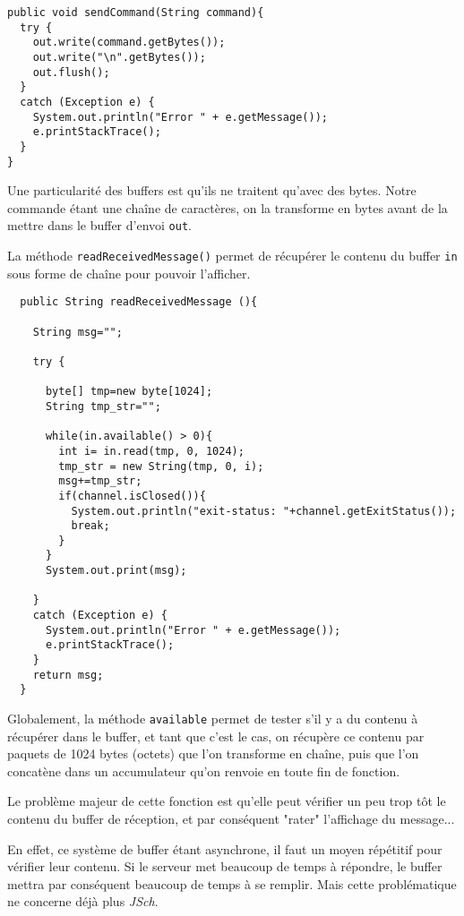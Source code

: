 \begin{verbatim}
public void sendCommand(String command){
  try {
    out.write(command.getBytes());
    out.write("\n".getBytes());
    out.flush();
  }
  catch (Exception e) {
    System.out.println("Error " + e.getMessage());
    e.printStackTrace();
  }
}
\end{verbatim}

\par Une particularité des buffers est qu'ils ne traitent qu'avec des bytes. Notre commande étant une chaîne de caractères, on la transforme en bytes avant de la mettre dans le buffer d'envoi \texttt{out}.
\par La méthode \texttt{readReceivedMessage()} permet de récupérer le contenu du buffer \texttt{in} sous forme de chaîne pour pouvoir l'afficher.

\begin{verbatim}
  public String readReceivedMessage (){
    
    String msg="";
    
    try {
      
      byte[] tmp=new byte[1024];
      String tmp_str="";
      
      while(in.available() > 0){
        int i= in.read(tmp, 0, 1024);
        tmp_str = new String(tmp, 0, i);
        msg+=tmp_str;
        if(channel.isClosed()){
          System.out.println("exit-status: "+channel.getExitStatus());
          break;
        }
      }
      System.out.print(msg);
      
    }
    catch (Exception e) {
      System.out.println("Error " + e.getMessage());
      e.printStackTrace();
    }
    return msg;
  }
\end{verbatim}

\par Globalement, la méthode \texttt{available} permet de tester s'il y a du contenu à récupérer dans le buffer, et tant que c'est le cas, on récupère ce contenu par paquets de 1024 bytes (octets) que l'on transforme en chaîne, puis que l'on concatène dans un accumulateur qu'on renvoie en toute fin de fonction.

\par Le problème majeur de cette fonction est qu'elle peut vérifier un peu trop tôt le contenu du buffer de réception, et par conséquent "rater" l'affichage du message...

\par En effet, ce système de buffer étant asynchrone, il faut un moyen répétitif pour vérifier leur contenu. Si le serveur met beaucoup de temps à répondre, le buffer mettra par conséquent beaucoup de temps à se remplir. Mais cette problématique ne concerne déjà plus \emph{JSch}.

